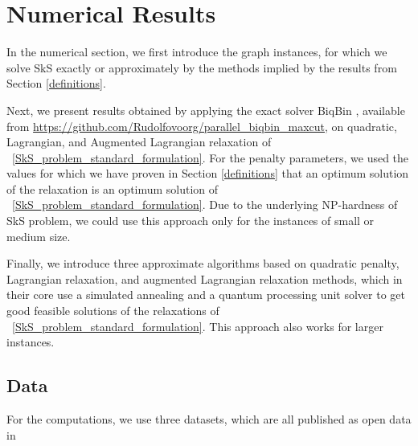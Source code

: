 \documentclass{article}
\begin{document}
\section{Numerical Results}




In the numerical section, we first introduce the graph instances, for which we solve SkS exactly or approximately by the methods implied by the results from  Section \ref{definitions}. 

Next, we present results obtained by applying the exact solver BiqBin \cite{gusmeroli2022biqbin}, available from 
\url{https://github.com/Rudolfovoorg/parallel_biqbin_maxcut}, on quadratic, Lagrangian, and Augmented Lagrangian relaxation of ~\eqref{SkS_problem_standard_formulation}. For the penalty parameters, we used the values for which we have proven in Section \ref{definitions} that   an optimum solution of the relaxation is an optimum solution of ~\eqref{SkS_problem_standard_formulation}.
Due to the underlying NP-hardness of SkS problem, we could use this approach only for the instances of small or medium size.

Finally, we introduce three approximate algorithms based on quadratic penalty, Lagrangian relaxation, and augmented Lagrangian relaxation methods, which in their core use a simulated annealing  and 
 a quantum processing unit solver to get good feasible solutions of the relaxations of ~\eqref{SkS_problem_standard_formulation}.
 This approach also works for larger instances.

 
\subsection{Data}\label{sec:Data}
For the computations, we use three datasets, which are all published as open data in \cite{Github_Data} 
\end{document}
